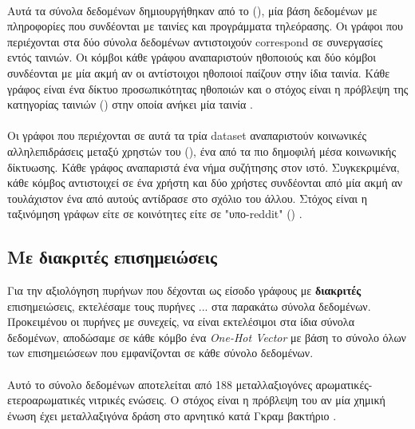 \paragraph*{}
Αυτά τα σύνολα δεδομένων δημιουργήθηκαν από το  (), μία  βάση δεδομένων με πληροφορίες που συνδέονται με ταινίες και προγράμματα τηλεόρασης.
Οι γράφοι που περιέχονται στα δύο σύνολα δεδομένων αντιστοιχούν correspond σε συνεργασίες εντός ταινιών.
Οι κόμβοι κάθε γράφου αναπαριστούν ηθοποιούς και δύο κόμβοι συνδέονται με μία ακμή αν οι αντίστοιχοι ηθοποιοί παίζουν στην ίδια ταινία.
Κάθε γράφος είναι ένα  δίκτυο προσωπικότητας ηθοποιών και ο στόχος είναι η πρόβλεψη της κατηγορίας ταινιών () στην οποία ανήκει μία ταινία \cite{DGK_PINAR}.

\paragraph*{}
Οι γράφοι που περιέχονται σε αυτά τα τρία dataset αναπαριστούν κοινωνικές αλληλεπιδράσεις μεταξύ χρηστών του  (), ένα από τα πιο δημοφιλή μέσα κοινωνικής δίκτυωσης.
Κάθε γράφος αναπαριστά ένα νήμα συζήτησης στον ιστό.
Συγκεκριμένα, κάθε κόμβος αντιστοιχεί σε ένα χρήστη και δύο χρήστες συνδέονται από μία ακμή αν τουλάχιστον ένα από αυτούς αντίδρασε στο σχόλιο του άλλου.
Στόχος είναι η ταξινόμηση γράφων είτε σε κοινότητες είτε σε "υπο-reddit" () \cite{DGK_PINAR}.

\subsection{Με διακριτές επισημειώσεις}
Για την αξιολόγηση πυρήνων που δέχονται ως είσοδο γράφους με \textbf{διακριτές} επισημειώσεις, εκτελέσαμε τους πυρήνες ... στα παρακάτω σύνολα δεδομένων.
Προκειμένου οι πυρήνες με συνεχείς, να είναι εκτελέσιμοι στα ίδια σύνολα δεδομένων, αποδώσαμε σε κάθε κόμβο ένα \textit{One-Hot Vector} με βάση το σύνολο όλων των επισημειώσεων που εμφανίζονται σε κάθε σύνολο δεδομένων.
\paragraph*{} Αυτό το σύνολο δεδομένων αποτελείται από 188 μεταλλαξιογόνες αρωματικές-ετεροαρωματικές νιτρικές ενώσεις.
Ο στόχος είναι η πρόβλεψη του αν μία χημική ένωση έχει μεταλλαξιγόνα δράση στο αρνητικό κατά Γκραμ βακτήριο  \cite{shervashidze2011weisfeiler}.

